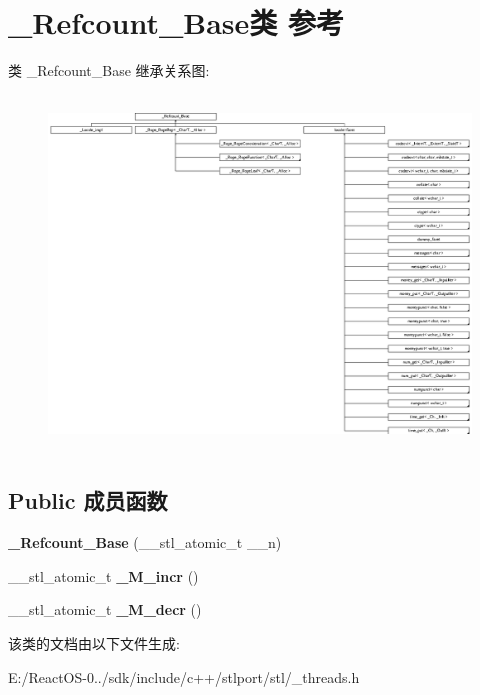 \hypertarget{class___refcount___base}{}\section{\+\_\+\+Refcount\+\_\+\+Base类 参考}
\label{class___refcount___base}
类 \+\_\+\+Refcount\+\_\+\+Base 继承关系图\+:\begin{figure}[H]
\begin{center}
\leavevmode
\includegraphics[height=9.464788cm]{class___refcount___base}
\end{center}
\end{figure}
\subsection*{Public 成员函数}
\begin{DoxyCompactItemize}
\item 
\mbox{\label{class___refcount___base_ad9c78e56ae43fa185c38cd197d7d823c}} 
{\bfseries \+\_\+\+Refcount\+\_\+\+Base} (\+\_\+\+\_\+stl\+\_\+atomic\+\_\+t \+\_\+\+\_\+n)
\item 
\mbox{\label{class___refcount___base_ad191898b3065b4b8e15fdb3879797741}} 
\+\_\+\+\_\+stl\+\_\+atomic\+\_\+t {\bfseries \+\_\+\+M\+\_\+incr} ()
\item 
\mbox{\label{class___refcount___base_ad6e973793b022a734aef93fe119fe787}} 
\+\_\+\+\_\+stl\+\_\+atomic\+\_\+t {\bfseries \+\_\+\+M\+\_\+decr} ()
\end{DoxyCompactItemize}


该类的文档由以下文件生成\+:\begin{DoxyCompactItemize}
\item 
E\+:/\+React\+O\+S-\/0../sdk/include/c++/stlport/stl/\+\_\+threads.\+h\end{DoxyCompactItemize}

